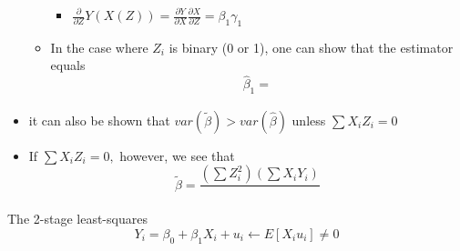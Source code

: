 \documentclass[10pt, oneside]{article}
\begin{document}
\begin{itemize}
\begin{itemize}
\begin{itemize}
            \item $\frac{\partial}{\partial Z} Y(X(Z)) = \frac{\partial Y}{\partial X} \frac{\partial X}{\partial Z} = \beta_1 \gamma_1$
        \end{itemize}
        \item In the case where $Z_i$ is binary (0 or 1), one can show that the estimator equals \[\hat \beta_1 = \frac{}{}\]
    \end{itemize}
    \item it can also be shown that $var(\tilde \beta) > var(\hat \beta)$ unless $\sum X_i Z_i = 0$
    \item If $\sum X_i Z_i = 0,$ however, we see that\[\tilde \beta = \frac{(\sum Z_i^2 ) (\sum X_i Y_i)}{}\]
\end{itemize}
The 2-stage least-squares
\[Y_i = \beta_0 + \beta_1 X_i + u_i \leftarrow E[X_i u_i] \neq 0\]
\end{document}
